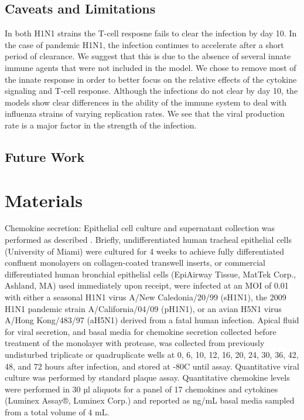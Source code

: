 \documentclass[10pt]{article}
\begin{document}
\subsection*{Caveats and Limitations}

In both H1N1 strains the T-cell resposne fails to clear the infection by day 10.  In the case of pandemic H1N1, the infection continues to accelerate after a short period of clearance.  We suggest that this is due to the absence of several innate immune agents that were not included in the model.  We chose to remove most of the innate response in order to better focus on the relative effects of the cytokine signaling and T-cell response.  Although the infections do not clear by day 10, the models show clear differences in the ability of the immune system to deal with influenza strains of varying replication rates.  We see that the viral production rate is a major factor in the strength of the infection.

\subsection*{Future Work}



\section*{Materials}

Chemokine secretion:  Epithelial cell culture and supernatant collection was performed as described \cite{Mitchell2011}.  Briefly, undifferentiated human tracheal epithelial cells (University of Miami) were cultured for 4 weeks to achieve fully differentiated confluent monolayers on collagen-coated transwell inserts, or commercial differentiated human bronchial epithelial cells (EpiAirway Tissue, MatTek Corp., Ashland, MA) used immediately upon receipt, were infected at an MOI of 0.01 with either a seasonal H1N1 virus A/New Caledonia/20/99 (sH1N1), the 2009 H1N1 pandemic strain A/California/04/09 (pH1N1), or an avian H5N1 virus A/Hong Kong/483/97 (aH5N1) derived from a fatal human infection.  Apical fluid for viral secretion, and basal media for chemokine secretion collected before treatment of the monolayer with protease, was collected from previously undisturbed triplicate or quadruplicate wells at 0, 6, 10, 12, 16, 20, 24, 30, 36, 42, 48, and 72 hours after infection, and stored at -80C until assay.  Quantitative viral culture was performed by standard plaque assay.  Quantitative chemokine levels were performed in 30 µl aliquots for a panel of 17 chemokines and cytokines (Luminex Assay®, Luminex Corp.) and reported as ng/mL basal media sampled from a total volume of 4 mL.
\end{document}
